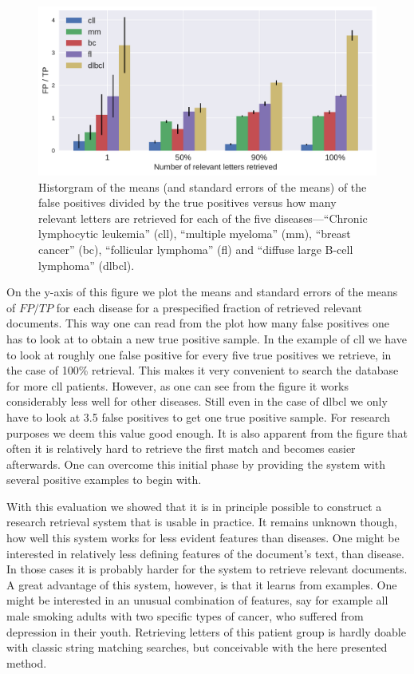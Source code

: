 \begin{figure}[t]
	\includegraphics[width=\textwidth]{figures/intelligent_search}
	\caption{Historgram of the means (and standard errors of the means) of the false positives divided by the true positives versus how many relevant letters are retrieved for each of the five diseases---``Chronic lymphocytic leukemia'' (cll), ``multiple myeloma'' (mm), ``breast cancer'' (bc), ``follicular lymphoma'' (fl) and ``diffuse large B-cell lymphoma'' (dlbcl).}
	\label{fig:intelligent_search}
\end{figure} 

On the y-axis of this figure we plot the means and standard errors of the means of $FP/TP$ for each disease for a prespecified fraction of retrieved relevant documents. This way one can read from the plot how many false positives one has to look at to obtain a new true positive sample. In the example of cll we have to look at roughly one false positive for every five true positives we retrieve, in the case of 100\% retrieval. This makes it very convenient to search the database for more cll patients. However, as one can see from the figure it works considerably less well for other diseases. Still even in the case of dlbcl we only have to look at 3.5 false positives to get one true positive sample. For research purposes we deem this value good enough. It is also apparent from the figure that often it is relatively hard to retrieve the first match and becomes easier afterwards. One can overcome this initial phase by providing the system with several positive examples to begin with.

With this evaluation we showed that it is in principle possible to construct a research retrieval system that is usable in practice. It remains unknown though, how well this system works for less evident features than diseases. One might be interested in relatively less defining features of the document's text, than disease. In those cases it is probably harder for the system to retrieve relevant documents. A great advantage of this system, however, is that it learns from examples. One might be interested in an unusual combination of features, say for example all male smoking adults with two specific types of cancer, who suffered from depression in their youth. Retrieving letters of this patient group is hardly doable with classic string matching searches, but conceivable with the here presented method.

